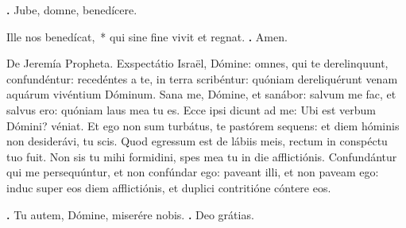 \begin{small}
\textbf{\Vbar.} Jube, domne, benedícere.

Ille nos benedícat,~* qui sine fine vivit et regnat. \textbf{\Rbar.} Amen.
\end{small}


De Jeremía Propheta. 
Exspectátio Israël, Dómine: omnes, qui te derelinquunt, confundéntur: recedéntes a te, in terra scribéntur: quóniam dereliquérunt venam aquárum vivéntium Dóminum.
Sana me, Dómine, et sanábor: salvum me fac, et salvus ero: quóniam laus mea tu es.
Ecce ipsi dicunt ad me: Ubi est verbum Dómini? véniat.
Et ego non sum turbátus, te pastórem sequens: et diem hóminis non desiderávi, tu scis. Quod egressum est de lábiis meis, rectum in conspéctu tuo fuit.
Non sis tu mihi formidini, spes mea tu in die afflictiónis.
Confundántur qui me persequúntur, et non confúndar ego: paveant illi, et non paveam ego: induc super eos diem afflictiónis, et duplici contritióne cóntere eos.

\textbf{\Vbar.} Tu autem, Dómine, miserére nobis.
\textbf{\Rbar.} Deo grátias.

